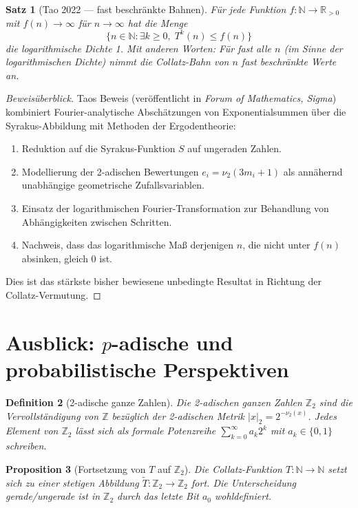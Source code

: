 \documentclass[12pt,a4paper]{article}
\newtheorem{theorem}{Satz}[section]
\newtheorem{proposition}[theorem]{Proposition}
\newtheorem{definition}[theorem]{Definition}
\begin{document}
\begin{theorem}[Tao 2022 — fast beschränkte Bahnen]\label{thm:tao}
Für jede Funktion $f\colon \mathbb{N} \to \mathbb{R}_{>0}$ mit $f(n) \to \infty$ für
$n \to \infty$ hat die Menge
\[
  \bigl\{ n \in \mathbb{N} : \exists k \geq 0,\; T^k(n) \leq f(n) \bigr\}
\]
die logarithmische Dichte 1. Mit anderen Worten: Für fast alle $n$ (im Sinne der
logarithmischen Dichte) nimmt die Collatz-Bahn von $n$ fast beschränkte Werte an.
\end{theorem}

\begin{proof}[Beweisüberblick]
Taos Beweis \cite{Tao2022} (veröffentlicht in \emph{Forum of Mathematics, Sigma})
kombiniert Fourier-analytische Abschätzungen von
Exponentialsummen über die Syrakus-Abbildung mit Methoden der Ergodentheorie:
\begin{enumerate}
  \item Reduktion auf die Syrakus-Funktion $S$ auf ungeraden Zahlen.
  \item Modellierung der 2-adischen Bewertungen $e_i = \nu_2(3m_i+1)$ als annähernd
        unabhängige geometrische Zufallsvariablen.
  \item Einsatz der logarithmischen Fourier-Transformation zur Behandlung von
        Abhängigkeiten zwischen Schritten.
  \item Nachweis, dass das logarithmische Maß derjenigen $n$, die nicht unter
        $f(n)$ absinken, gleich 0 ist.
\end{enumerate}
Dies ist das stärkste bisher bewiesene unbedingte Resultat in Richtung der
Collatz-Vermutung.
\end{proof}

\section{Ausblick: $p$-adische und probabilistische Perspektiven}\label{sec:padic_preview}

\begin{definition}[2-adische ganze Zahlen]\label{def:2adic}
Die \emph{2-adischen ganzen Zahlen} $\mathbb{Z}_2$ sind die Vervollständigung von
$\mathbb{Z}$ bezüglich der 2-adischen Metrik $|x|_2 = 2^{-\nu_2(x)}$. Jedes Element
von $\mathbb{Z}_2$ lässt sich als formale Potenzreihe $\sum_{k=0}^\infty a_k 2^k$
mit $a_k \in \{0,1\}$ schreiben.
\end{definition}

\begin{proposition}[Fortsetzung von $T$ auf $\mathbb{Z}_2$]\label{prop:extension}
Die Collatz-Funktion $T\colon \mathbb{N} \to \mathbb{N}$ setzt sich zu einer stetigen
Abbildung $\tilde{T}\colon \mathbb{Z}_2 \to \mathbb{Z}_2$ fort. Die Unterscheidung
gerade/ungerade ist in $\mathbb{Z}_2$ durch das letzte Bit $a_0$ wohldefiniert.
\end{proposition}
\end{document}
